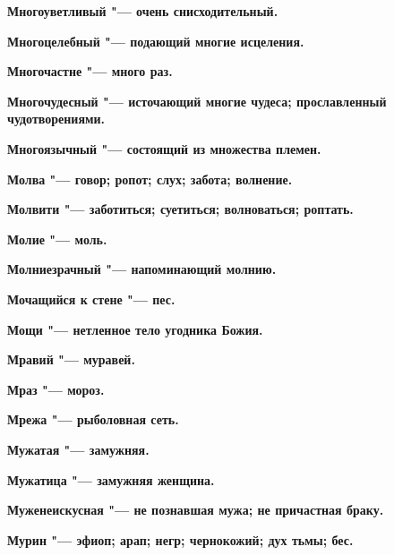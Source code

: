 \bfseries Многоуветливый \normalfont{} "--- очень снисходительный. 




\bfseries Многоцелебный \normalfont{} "--- подающий многие исцеления. 




\bfseries Многочастне \normalfont{} "--- много раз. 




\bfseries Многочудесный \normalfont{} "--- источающий многие чудеса; прославленный чудотворениями. 




\bfseries Многоязычный \normalfont{} "--- состоящий из множества племен. 




\bfseries Молва \normalfont{} "--- говор; ропот; слух; забота; волнение. 




\bfseries Молвити \normalfont{} "--- заботиться; суетиться; волноваться; роптать. 




\bfseries Молие \normalfont{} "--- моль. 




\bfseries Молниезрачный \normalfont{} "--- напоминающий молнию. 




\bfseries Мочащийся к стене \normalfont{} "--- пес. 




\bfseries Мощи \normalfont{} "--- нетленное тело угодника Божия. 




\bfseries Мравий \normalfont{} "--- муравей. 




\bfseries Мраз \normalfont{} "--- мороз. 




\bfseries Мрежа \normalfont{} "--- рыболовная сеть. 




\bfseries Мужатая \normalfont{} "--- замужняя. 




\bfseries Мужатица \normalfont{} "--- замужняя женщина. 




\bfseries Муженеискусная \normalfont{} "--- не познавшая мужа; не причастная браку. 




\bfseries Мурин \normalfont{} "--- эфиоп; арап; негр; чернокожий; дух тьмы; бес. 




